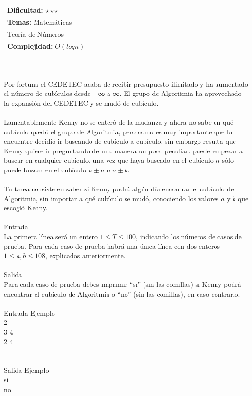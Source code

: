 \documentclass[12pt]{article}
\begin{document}
{{{\hfill
\begin{tabular}{@{}l@{}}
\textbf{Dificultad:} $\star\star\star$ \\
\textbf{Temas:} Matemáticas \\
Teoría de Números \\
\textbf{Complejidad:} $O(log n)$
\end{tabular}\\
\\
Por fortuna el CEDETEC acaba de recibir presupuesto ilimitado y ha aumentado el número de cubículos desde −∞ a ∞. El grupo de Algoritmia ha aprovechado la expansión del CEDETEC y se mudó de cubículo.\\
\\Lamentablemente Kenny no se enteró de la mudanza y ahora no sabe en qué cubículo quedó el grupo de Algoritmia, pero como es muy importante que lo encuentre decidió ir buscando de cubículo a cubículo, sin embargo resulta que Kenny quiere ir preguntando de una manera un poco peculiar: puede empezar a buscar en cualquier cubículo, una vez que haya buscado en el cubículo $n$ sólo puede buscar en el cubículo $n ± a$ o $n ± b$.\\
\\Tu tarea consiste en saber si Kenny podrá algún día encontrar el cubículo de Algoritmia, sin importar a qué cubículo se mudó, conociendo los valores $a$ y $b$ que escogió Kenny.
\\
\\
\textrm{\large Entrada}
\\
La primera línea será un entero $1 ≤ T ≤ 100$, indicando los números de casos de prueba. Para cada caso de prueba habrá una única línea con dos enteros $1 ≤ a, b ≤ 108$, explicados anteriormente.
\\
\\
\textrm{\large Salida}
\\
Para cada caso de prueba debes imprimir “si” (sin las comillas) si Kenny podrá encontrar el cubículo de Algoritmia o “no” (sin las comillas), en caso contrario.
\\
\\
\textrm{\large Entrada Ejemplo}
\\
2\\
3 4\\
2 4\\
\\
\\
\textrm{\large Salida Ejemplo}
\\
si\\
no\\
}}}
\end{document}
